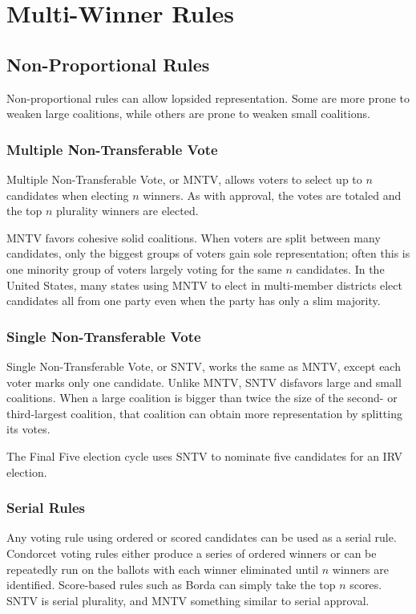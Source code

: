 \section{Multi-Winner Rules}

\subsection{Non-Proportional Rules}
Non-proportional rules can allow lopsided representation.  Some are more prone to weaken large coalitions, while others are prone to weaken small coalitions.

\subsubsection{Multiple Non-Transferable Vote}
Multiple Non-Transferable Vote, or MNTV, allows voters to select up to $n$ candidates when electing $n$ winners.  As with approval, the votes are totaled and the top $n$ plurality winners are elected.

MNTV favors cohesive solid coalitions.  When voters are split between many candidates, only the biggest groups of voters gain sole representation; often this is one minority group of voters largely voting for the same $n$ candidates.  In the United States, many states using MNTV to elect in multi-member districts elect candidates all from one party even when the party has only a slim majority.

\subsubsection{Single Non-Transferable Vote}

Single Non-Transferable Vote, or SNTV, works the same as MNTV, except each voter marks only one candidate.  Unlike MNTV, SNTV disfavors large and small coalitions.  When a large coalition is bigger than twice the size of the second- or third-largest coalition, that coalition can obtain more representation by splitting its votes.

The Final Five election cycle uses SNTV to nominate five candidates for an IRV election.

\subsubsection{Serial Rules}

Any voting rule using ordered or scored candidates can be used as a serial rule.  Condorcet voting rules either produce a series of ordered winners or can be repeatedly run on the ballots with each winner eliminated until $n$ winners are identified.  Score-based rules such as Borda can simply take the top $n$ scores.  SNTV is serial plurality, and MNTV something similar to serial approval.

